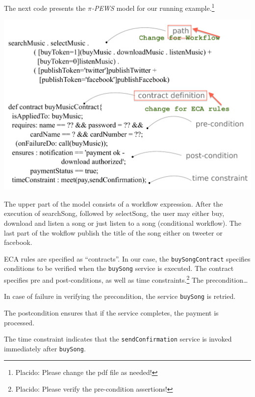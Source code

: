 \begin{example}\label{Colocar-o-label-correto-aqui}
The next code presents the \textit{$\pi$-PEWS}  model for our running example.\footnote{\color{red} Placido: Please change the pdf file as needed!}

\begin{center}
\includegraphics[scale=0.7]{figs/pewsEspecificationContract.pdf}
\end{center}

The upper part of the model consists of a workflow expression.
After the execution of searchSong, followed by selectSong,
the user may either buy, download and listen a song or just listen to a song (conditional workflow).
The last part of the wokflow publish the title of the song either on tweeter or facebook.

ECA rules are specified as ``contracts''.
In our case, the \texttt{buySongContract} specifies conditions to be verified when the \texttt{buySong} service is executed.
The contract specifies pre and post-conditions, as well as time constraints.\footnote{\color{red} Placido: Please verify the pre-condition assertions!}
The precondition\dots

In case of failure in verifying the precondition, the service \texttt{buySong} is retried.

The postcondition ensures that if the service completes, the payment is processed.

The time constraint indicates that the \texttt{sendConfirmation} service is invoked immediately after \texttt{buySong}.
\end{example}




